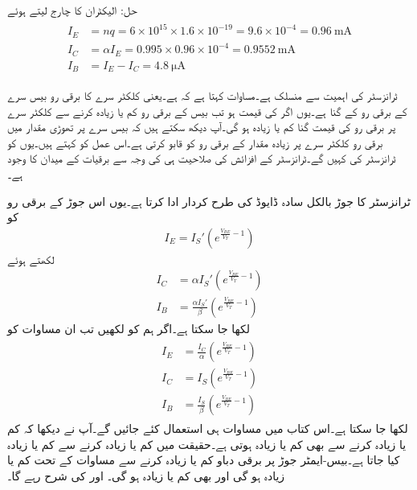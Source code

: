حل:
	الیکٹران کا چارج  لیتے ہوئے
\begin{gather}
\begin{aligned}
I_E&=nq=6 \times 10^{15} \times 1.6 \times 10^{-19}=9.6 \times 10^{-4}=\SI{0.96}{\milli \ampere}\\
I_C&=\alpha I_E = 0.995 \times 0.96 \times 10^{-4}=\SI{0.9552}{\milli \ampere}\\
I_B&=I_E-I_C=\SI{4.8}{\micro \ampere}
\end{aligned}
\end{gather}

ٹرانزسٹر کی اہمیت  سے منسلک ہے۔مساوات   کہتا ہے کہ   ہے۔یعنی کلکٹر  سرے کا برقی رو بیس سرے کے برقی رو کے  گنا ہے۔یوں اگر  کی قیمت  ہو تب بیس کے برقی رو کم یا زیادہ کرنے سے کلکٹر  سرے پر برقی رو کی قیمت  گنا کم یا زیادہ ہو گی۔آپ دیکھ سکتے ہیں کہ بیس سرے پر تھوڑی مقدار میں برقی رو کلکٹر  سرے پر زیادہ مقدار کے برقی رو کو قابو کرتی ہے۔اس عمل کو   کہتے ہیں۔یوں  کو ٹرانزسٹر کی   کہیں گے۔ٹرانزسٹر کے افزائش کی صلاحیت ہی کی وجہ سے برقیات کے میدان کا وجود ہے۔

ٹرانزسٹر کا  جوڑ بالکل سادہ ڈایوڈ کی طرح کردار ادا کرتا ہے۔یوں اس جوڑ کے برقی رو کو
\begin{align*}
I_E=I_S' \left(e^{\frac{V_{BE}}{V_T}-1} \right)
\end{align*}
لکھتے ہوئے 
\begin{align*}
I_C&=\alpha  I_S' \left(e^{\frac{V_{BE}}{V_T}-1} \right)\\
I_B&=\frac{\alpha I_S'}{\beta} \left(e^{\frac{V_{BE}}{V_T}-1} \right)
\end{align*}
لکھا جا سکتا ہے۔اگر ہم   کو  لکھیں تب ان مساوات کو
\begin{gather}
\begin{aligned}\label{مساوات_ٹرانزسٹر_بنیادی_ڈایوڈ-مساوات}
I_E&=\frac{I_C}{\alpha} \left(e^{\frac{V_{BE}}{V_T}-1} \right)\\
I_C &= I_S \left(e^{\frac{V_{BE}}{V_T}-1} \right)\\
I_B&=\frac{I_S}{\beta} \left(e^{\frac{V_{BE}}{V_T}-1} \right)
\end{aligned}
\end{gather}
لکھا جا سکتا ہے۔اس کتاب میں مساوات  ہی استعمال کئے جائیں گے۔آپ نے دیکھا کہ  کم یا زیادہ کرنے سے  بھی کم یا زیادہ ہوتی ہے۔حقیقت میں  کم یا زیادہ کرنے سے  کم یا زیادہ کیا جاتا ہے۔بیس-ایمٹر جوڑ پر برقی دباو  کم یا زیادہ کرنے سے   مساوات  کے تحت کم یا زیادہ  ہو گی اور  بھی کم یا زیادہ ہو گی۔ اور  کی شرح  رہے گا۔

